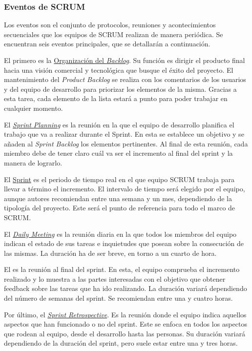\subsubsection{Eventos de SCRUM}

Los eventos son el conjunto de protocolos, reuniones y acontecimientos secuenciales que los equipos de SCRUM realizan de manera periódica. Se encuentran seis eventos principales, que se detallarán a continuación.


El primero es la \underline{Organización del \textit{Backlog}}. Su función es dirigir el producto final hacia una visión comercial y tecnológica que busque el éxito del proyecto. El mantenimiento del \textit{Product Backlog} se realiza con los comentarios de los usuarios y del equipo de desarrollo para priorizar los elementos de la misma. Gracias a esta tarea, cada elemento de la lista estará a punto para poder trabajar en cualquier momento.

El \underline{\textit{Sprint Planning}} es la reunión en la que el equipo de desarrollo planifica el trabajo que va a realizar durante el Sprint. En esta se establece un objetivo y se añaden al \textit{Sprint Backlog} los elementos pertinentes. Al final de esta reunión, cada miembro debe de tener claro cuál va ser el incremento al final del sprint y la manera de lograrlo.

El \underline{Sprint} es el periodo de tiempo real en el que equipo SCRUM trabaja para llevar a término el incremento. El intervalo de tiempo será elegido por el equipo, aunque autores recomiendan entre una semana y un mes, dependiendo de la tipología del proyecto. Este será el punto de referencia para todo el marco de SCRUM.

El \underline{\textit{Daily Meeting}} es la reunión diaria en la que todos los miembros del equipo indican el estado de sus tareas e inquietudes que posean sobre la consecución de las mismas. La duración ha de ser breve, en torno a un cuarto de hora.

El \underline{} es la reunión al final del sprint. En esta, el equipo comprueba el incremento realizado y lo muestra a las partes interesadas con el objetivo que obtener feedback sobre las tareas que ha ido realizando. La duración variará dependiendo del número de semanas del sprint. Se recomiendan entre una y cuatro horas.

Por último, el \underline{\textit{Sprint Retrospective}}. Es la reunión donde el equipo indica aquellos aspectos que han funcionado o no del sprint. Este se enfoca en todos los aspectos que rodean al equipo, desde el desarrollo hasta las personas. Su duración variará dependiendo de la duración del sprint, pero suele estar entre una y tres horas.

